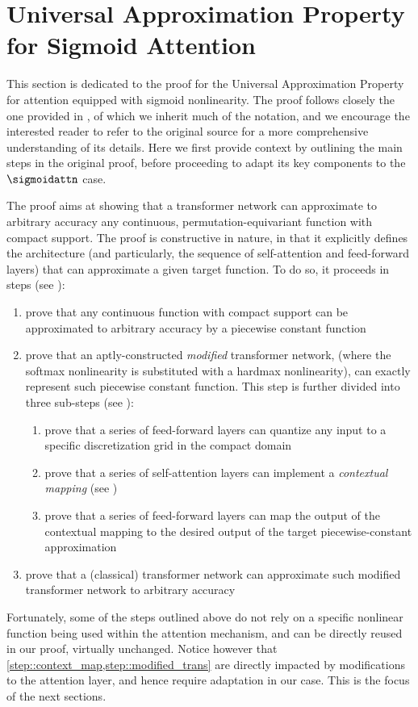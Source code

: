 \section{Universal Approximation Property for Sigmoid Attention}
\label{app:UAP_proof}
This section is dedicated to the proof for the Universal Approximation Property for attention equipped with sigmoid nonlinearity. The proof follows closely the one provided in \citet[Sec.~3]{Yun_UAP}, of which we inherit much of the notation, and we encourage the interested reader to refer to the original source for a more comprehensive understanding of its details. Here we first provide context by outlining the main steps in the original proof, before proceeding to adapt its key components to the $\sigmoidattn$ case.

The proof aims at showing that a transformer network can approximate to arbitrary accuracy any continuous, permutation-equivariant function with compact support. The proof is constructive in nature, in that it explicitly defines the architecture (and particularly, the sequence of self-attention and feed-forward layers) that can approximate a given target function. To do so, it proceeds in steps (see \citet[Sec.~3.2]{Yun_UAP}):
\begin{enumerate}
    \item\label{step::piecewise_approx} prove that any continuous function with compact support can be approximated to arbitrary accuracy by a piecewise constant function
    \item prove that an aptly-constructed \emph{modified} transformer network, (where the softmax nonlinearity is substituted with a hardmax nonlinearity), can exactly represent such piecewise constant function. This step is further divided into three sub-steps (see \citet[Sec.~4]{Yun_UAP}):
        \begin{enumerate}
            \item\label{step::quantisation} prove that a series of feed-forward layers can quantize any input to a specific discretization grid in the compact domain
            \item\label{step::context_map} prove that a series of self-attention layers can implement a \emph{contextual mapping} (see \citet[Def.~3.1]{Yun_UAP})
            \item\label{step::output_map} prove that a series of feed-forward layers can map the output of the contextual mapping to the desired output of the target piecewise-constant approximation
        \end{enumerate} 
    \item\label{step::modified_trans} prove that a (classical) transformer network can approximate such modified transformer network to arbitrary accuracy
\end{enumerate}
Fortunately, some of the steps outlined above do not rely on a specific nonlinear function being used within the attention mechanism, and can be directly reused in our proof, virtually unchanged. Notice however that \cref{step::context_map,step::modified_trans} are directly impacted by modifications to the attention layer, and hence require adaptation in our case. This is the focus of the next sections.

